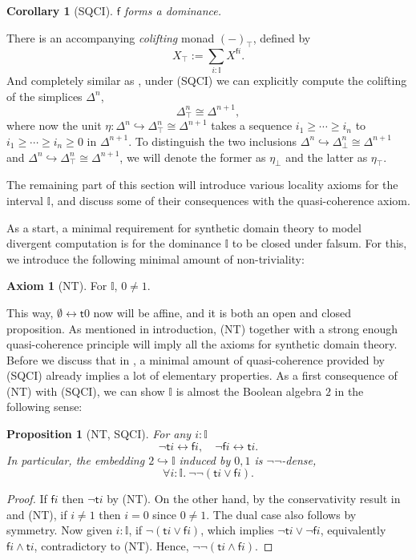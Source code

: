 \documentclass[12pt]{amsart}
\newtheorem{corollary}[theorem]{Corollary}
\newtheorem{proposition}[theorem]{Proposition}
\theoremstyle{definition}
\newtheorem*{axiom}{Axiom}
\newcommand{\mbb}[1]{\mathbb{#1}}
\newcommand{\I}{\mbb I}
\newcommand{\ms}[1]{\mathsf{#1}}
\newcommand{\hook}{\hookrightarrow}
\newcommand{\dneg}{\neg\neg}
\newcommand{\prt}{_{\bot}}
\newcommand{\cprt}{_{\top}}
\newcommand{\fa}[2]{\forall #1\!\colon\!\!#2.\ }
\newcommand{\emp}{\emptyset}
\newcommand{\eq}{\leftrightarrow}
\begin{document}
\begin{corollary}[SQCI]
  $\ms f$ forms a dominance.
\end{corollary}

There is an accompanying \emph{colifting} monad $(-)\cprt$, defined by
\[ X\cprt := \sum_{i:\I} X^{\ms fi}. \]
And completely similar as , under (SQCI) we can explicitly compute the colifting of the simplices $\Delta^n$,
\[ \Delta^n\cprt \cong \Delta^{n+1}, \]
where now the unit $\eta : \Delta^n \hook \Delta^n\cprt \cong \Delta^{n+1}$ takes a sequence $i_1 \ge \cdots \ge i_n$ to $i_1 \ge \cdots \ge i_n \ge 0$ in $\Delta^{n+1}$. To distinguish the two inclusions $\Delta^n \hook \Delta^n\prt \cong \Delta^{n+1}$ and $\Delta^n \hook \Delta^{n}\cprt \cong \Delta^{n+1}$, we will denote the former as $\eta\prt$ and the latter as $\eta\cprt$.

The remaining part of this section will introduce various locality axioms for the interval $\I$, and discuss some of their consequences with the quasi-coherence axiom.

As a start, a minimal requirement for synthetic domain theory to model divergent computation is for the dominance $\I$ to be closed under falsum. For this, we introduce the following minimal amount of non-triviality:

\begin{axiom}[NT]\label{ax:nt}
  For $\I$, $0 \neq 1$.
\end{axiom}


This way, $\emp \eq \ms t0$ now will be affine, and it is both an open and closed proposition. As mentioned in introduction, (NT) together with a strong enough quasi-coherence principle will imply all the axioms for synthetic domain theory. Before we discuss that in , a minimal amount of quasi-coherence provided by (SQCI) already implies a lot of elementary properties. As a first consequence of (NT) with (SQCI), we can show $\I$ is almost the Boolean algebra $2$ in the following sense:

\begin{proposition}[NT, SQCI]\label{prop:filed}
  For any $i : \I$ 
  \[ \neg \ms ti \eq \ms fi, \quad \neg\ms fi \eq \ms ti. \]
  In particular, the embedding $2 \hook \I$ induced by $0,1$ is $\neg\neg$-dense,
  \[ \fa i\I \dneg(\ms ti \vee \ms fi). \]
\end{proposition}
\begin{proof}
  If $\ms fi$ then $\neg\ms ti$ by (NT). On the other hand, by the conservativity result in  and (NT), if $i \neq 1$ then $i = 0$ since $0 \neq 1$. The dual case also follows by symmetry. Now given $i :\I$, if $\neg(\ms ti \vee \ms fi)$, which implies $\neg\ms ti \vee \neg\ms fi$, equivalently $\ms fi \wedge \ms ti$, contradictory to (NT). Hence, $\neg\neg(\ms ti \wedge \ms fi)$.
\end{proof}
\end{document}
